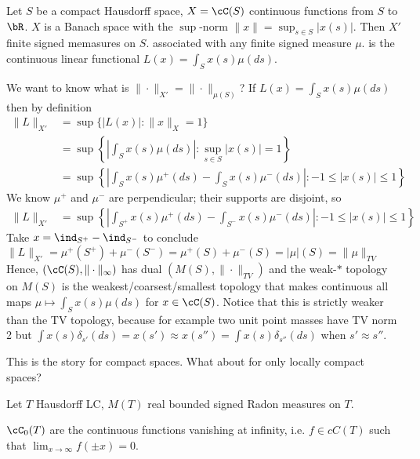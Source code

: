 \begin{example}
  Let $S$ be a compact Hausdorff space,
  $X = \cC(S)$ continuous functions from $S$ to $\bR$.
  $X$ is a Banach space with the $\sup$-norm $\|x\| = \sup_{s \in S} \lvert x(s) \rvert$.
  Then $X'$ finite signed memasures on $S$.
  associated with any finite signed measure $\mu$.
  is the continuous linear functional $L(x) = \int_S x(s) \mu(ds)$.

  We want to know what is $\|\cdot\|_{X'} = \|\cdot\|_{\mu(S)}$?
  If $L(x) = \int_S x(s) \mu(ds)$ then by definition
  \begin{align*}
    \|L\|_{X'}
  &= \sup\{ \lvert L(x) \rvert : \|x\|_X = 1 \} \\
  &= \sup\left\{ \left\lvert \int_S x(s) \mu(ds) \right\rvert : \sup_{s \in S} \lvert x(s) \rvert = 1 \right\} \\
  &= \sup\left\{ \left\lvert \int_S x(s) \mu^+(ds)  - \int_S x(s) \mu^-(ds) \right\rvert : -1 \leq \lvert x(s) \rvert \leq 1 \right\}
\end{align*}
We know $\mu^+$ and $\mu^-$ are perpendicular; their supports are disjoint, so
\begin{align*}
  \|L\|_{X'}
  &= \sup\left\{ \left\lvert
      \int_{S^+} x(s) \mu^+(ds)  - \int_{S^-} x(s) \mu^-(ds)
  \right\rvert : -1 \leq \lvert x(s) \rvert \leq 1 \right\}
\end{align*}
Take $x = \ind_{S^+} - \ind_{S^-}$ to conclude
$\|L\|_{X'} = \mu^+(S^+) + \mu^-(S^-) = \mu^+(S) + \mu^-(S) = \lvert \mu \rvert(S) = \|\mu\|_{TV}$
Hence, $(\cC(S), \|\cdot\|_{\infty})$ has dual
$(M(S), \|\cdot\|_{TV})$ and the weak-$\ast$ topology on $M(S)$
is the weakest/coarsest/smallest topology that makes continuous
all maps $\mu \mapsto \int_S x(s) \mu(ds)$ for $x \in \cC(S)$.
Notice that this is strictly weaker than the TV topology, because for example
two unit point masses have TV norm 2 but
$\int x(s) \delta_{s'}(ds) = x(s') \approx x(s'') = \int x(s) \delta_{s''}(ds)$
when $s' \approx s''$.
\end{example}

This is the story for compact spaces. What about for only locally compact spaces?

Let $T$ Hausdorff LC, $M(T)$ real bounded signed Radon measures on $T$.
\begin{definition}
  $\cC_0(T)$ are the continuous functions vanishing at infinity, i.e.
  $f \in cC(T)$ such that $\lim_{x \to \infty} f(\pm x) = 0$.
\end{definition}


